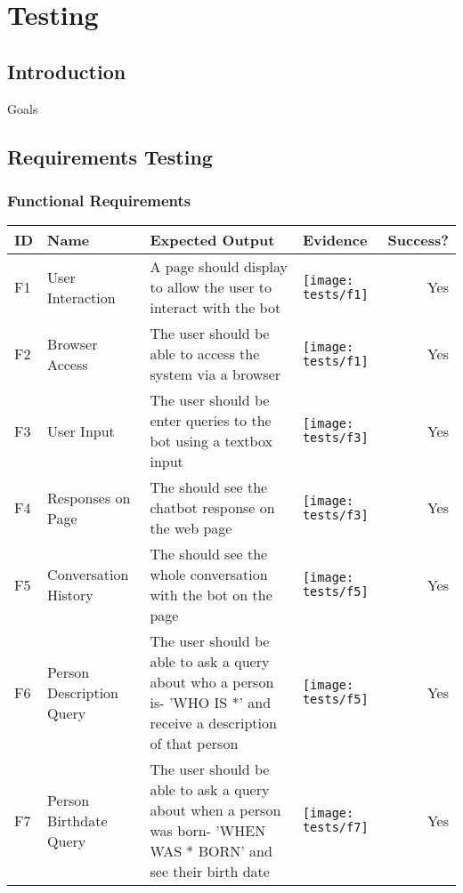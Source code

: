 \chapter{Testing}
\label{ch:testing}
\section{Introduction}
Goals
\newpage

\begin{landscape}
	\section{Requirements Testing}
	\subsection{Functional Requirements}
	\begin{tabularx}{\hsize}{lXXXr}
		\toprule
		ID & Name & Expected Output & Evidence & Success? \\
		\midrule
		F1 & User Interaction 
		& A page should display to allow the user to interact with the bot
		& \texttt{[image: tests/f1]} & Yes \\
		\midrule
		F2 & Browser Access
		& The user should be able to access the system via a browser
		& \texttt{[image: tests/f1]} & Yes \\
		\midrule
		F3 & User Input
		& The user should be enter queries to the bot using a textbox input
		& \texttt{[image: tests/f3]} & Yes \\
		\midrule
		F4 & Responses on Page
		& The should see the chatbot response on the web page
		& \texttt{[image: tests/f3]} & Yes \\
		\midrule
		F5 & Conversation History
		& The should see the whole conversation with the bot on the page
		& \texttt{[image: tests/f5]} & Yes \\
		\midrule
		F6 & Person Description Query
		& The user should be able to ask a query about who a person is\newline - 'WHO IS *' and receive a description of that person
		& \texttt{[image: tests/f5]} & Yes \\
		\midrule
		F7 & Person Birthdate Query
		& The user should be able to ask a query about when a person was born\newline - 'WHEN WAS * BORN' and see their birth date
		& \texttt{[image: tests/f7]} & Yes \\

\end{tabularx}
\end{landscape}
